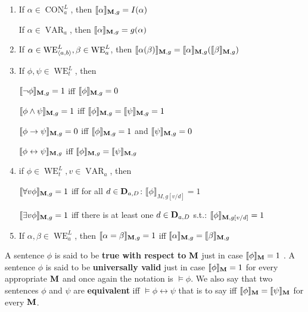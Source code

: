 \documentclass[11pt]{article}
\DeclareMathOperator{\VAR}{VAR}
\DeclareMathOperator{\CON}{CON}
\DeclareMathOperator{\WE}{WE}
\begin{document}
\begin{definition}[]
\begin{enumerate}
\item If \(\alpha\in \CON_a^L\), then
\(\llbracket\alpha\rrbracket_{\operatorname{\textbf{M}},g}=I(\alpha)\)

If \(\alpha\in \VAR_a\), then \(\llbracket\alpha\rrbracket_{\operatorname{\textbf{M}},g}=g(\alpha)\)

\item If \(\alpha\in \WE^L_{\la a,b\ra},\beta\in \WE^L_a\), then
\(\llbracket\alpha(\beta)\rrbracket_{\operatorname{\textbf{M}},g}=\llbracket\alpha\rrbracket_{\operatorname{\textbf{M}},g}(
       \llbracket\beta\rrbracket_{\operatorname{\textbf{M}},g})\)

\item If \(\phi,\psi\in \WE_t^L\), then

\(\llbracket\neg\phi\rrbracket_{\operatorname{\textbf{M}},g}=1\) iff
\(\llbracket\phi\rrbracket_{\operatorname{\textbf{M}},g}=0\)

\(\llbracket\phi\wedge\psi\rrbracket_{\operatorname{\textbf{M}},g}=1\) iff
\(\llbracket\phi\rrbracket_{\operatorname{\textbf{M}},g}=\llbracket\psi\rrbracket_{\operatorname{\textbf{M}},g}=1\)

\(\llbracket\phi\to\psi\rrbracket_{\operatorname{\textbf{M}},g}=0\) iff
\(\llbracket\phi\rrbracket_{\operatorname{\textbf{M}},g}=1\) and
\(\llbracket\psi\rrbracket_{\operatorname{\textbf{M}},g}=0\)

\(\llbracket\phi\leftrightarrow\psi\rrbracket_{\operatorname{\textbf{M}},g}\) iff
\(\llbracket\phi\rrbracket_{\operatorname{\textbf{M}},g}=\llbracket\psi\rrbracket_{\operatorname{\textbf{M}},g}\)

\item if \(\phi\in \WE_t^L,v\in \VAR_a\), then

\(\llbracket\forall v\phi\rrbracket_{\operatorname{\textbf{M}},g}=1\) iff for all
\(d\in\operatorname{\textbf{D}}_{a,D}\):
\(\llbracket\phi\rrbracket_{M,g[v/d]}=1\)

\(\llbracket\exists v\phi\rrbracket_{\operatorname{\textbf{M}},g}=1\) iff there is at least one
\(d\in\operatorname{\textbf{D}}_{a,D}\) s.t.: \(\llbracket\phi\rrbracket_{\operatorname{\textbf{M}},g[v/d]}=1\)

\item If \(\alpha,\beta\in \WE_a^L\), then
\(\llbracket\alpha=\beta\rrbracket_{\operatorname{\textbf{M}},g}=1\) iff
\(\llbracket\alpha\rrbracket_{\operatorname{\textbf{M}},g}=\llbracket\beta\rrbracket_{\operatorname{\textbf{M}},g}\)
\end{enumerate}
\end{definition}

A sentence \(\phi\) is said to be \textbf{true with respect to} \(\operatorname{\textbf{M}}\) just in case
\(\llbracket\phi\rrbracket_{\operatorname{\textbf{M}}}=1\) . A sentence \(\phi\) is said to be
\textbf{universally valid} just in case \(\llbracket\phi\rrbracket_{\operatorname{\textbf{M}}}=1\) for
every appropriate \(\operatorname{\textbf{M}}\) and once again the notation is \(\models\phi\). We
also say that two sentences \(\phi\) and \(\psi\) are \textbf{equivalent} iff
\(\models\phi\leftrightarrow\psi\) that is to say iff
\(\llbracket\phi\rrbracket_{\operatorname{\textbf{M}}}=\llbracket\psi\rrbracket_{\operatorname{\textbf{M}}}\) for every \(\operatorname{\textbf{M}}\).
\end{document}
